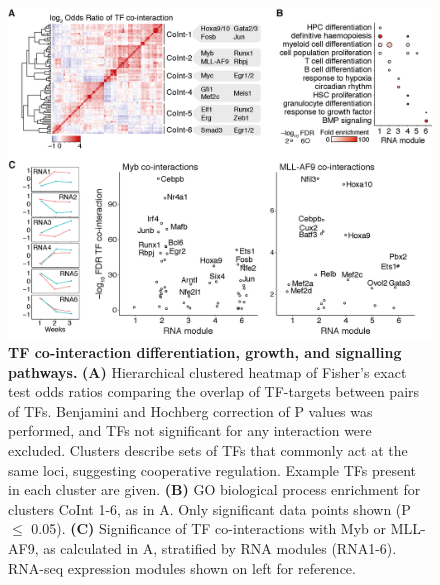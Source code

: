 \begin{figure}[!t]
    \centering
    \includegraphics[width=\textwidth,height=\textheight,keepaspectratio]{figures/chapter5/ch5_co-interaction.png}
    \caption[{TF co-interaction drives differentiation, growth, and signalling pathways.}]
    {\textbf{TF co-interaction differentiation, growth, and signalling pathways.}
    \textbf{(A)} Hierarchical clustered heatmap of Fisher's exact test odds ratios comparing the overlap of TF-targets between pairs of TFs. Benjamini and Hochberg correction of P values was performed, and TFs not significant for any interaction were excluded. Clusters describe sets of TFs that commonly act at the same loci, suggesting cooperative regulation. Example TFs present in each cluster are given. 
    \textbf{(B)} GO biological process enrichment for clusters CoInt 1-6, as in A. Only significant data points shown (P $\leq$ 0.05). 
    \textbf{(C)} Significance of TF co-interactions with Myb or MLL-AF9, as calculated in A, stratified by RNA modules (RNA1-6). RNA-seq expression modules shown on left for reference. 
    }
    \label{fig:ch5_co-interaction}
\end{figure}

